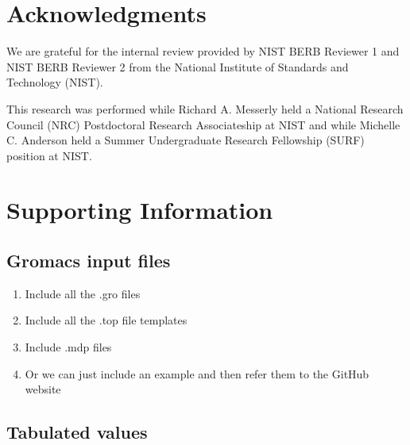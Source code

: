 \documentclass[preprint,review,12pt]{elsarticle}
\begin{document}
	\section*{Acknowledgments}
	
	We are grateful for the internal review provided by NIST BERB Reviewer 1 and NIST BERB Reviewer 2 from the National Institute of Standards and Technology (NIST). 
	
	This research was performed while Richard A. Messerly held a National Research Council (NRC) Postdoctoral Research Associateship at NIST and while Michelle C. Anderson held a Summer Undergraduate Research Fellowship (SURF) position at NIST.
	
	
	
	
	\section{Supporting Information}
	
	\subsection{Gromacs input files}
	
	\begin{enumerate}
		\item Include all the .gro files
		\item Include all the .top file templates
		\item Include .mdp files
		\item Or we can just include an example and then refer them to the GitHub website
	\end{enumerate}
	
	\subsection{Tabulated values}
	
\end{document}
